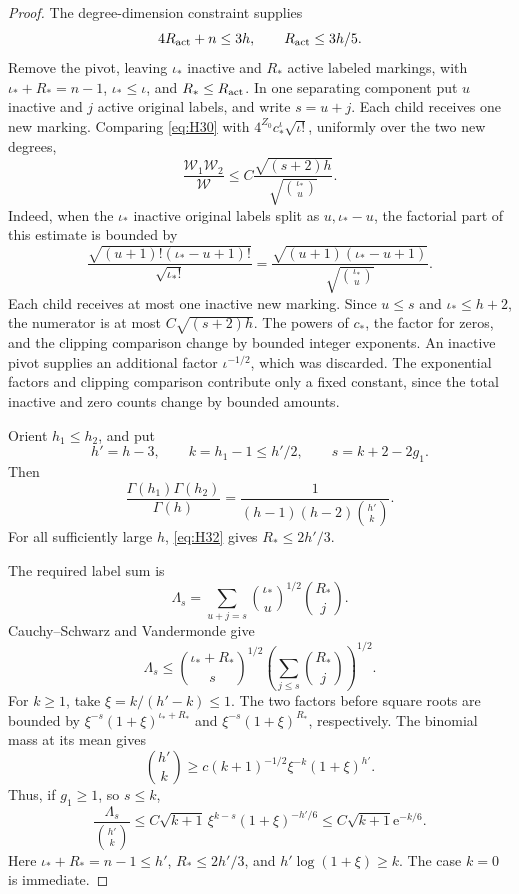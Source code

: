 \begin{proof}
The degree-dimension constraint supplies \begin{equation}
4R_{\rm act}+n\le3h,\qquad R_{\rm act}\le3h/5.
\label{eq:H32}
\end{equation} Remove the pivot, leaving \(\iota_*\) inactive and \(R_*\) active labeled
markings, with \(\iota_*+R_*=n-1\), \(\iota_*\le \iota\), and \(R_*\le R_{\rm act}\). In
one separating component put \(u\) inactive and \(j\) active original
labels, and write \(s=u+j\). Each child receives one new marking.
Comparing \eqref{eq:H30} with \(4^{Z_0}c_*^\iota\sqrt{\iota!}\), uniformly over the two
new degrees, \begin{equation}
\frac{\mathcal W_1\mathcal W_2}{\mathcal W}
\le C\frac{\sqrt{(s+2)h}}{\sqrt{\binom{\iota_*}u}}.
\label{eq:H33}
\end{equation} Indeed, when the \(\iota_*\) inactive original labels split as \(u,\iota_*-u\), the factorial part of this estimate is bounded by
\[
 \frac{\sqrt{(u+1)!(\iota_*-u+1)!}}{\sqrt{\iota_*!}}
 =\frac{\sqrt{(u+1)(\iota_*-u+1)}}{\sqrt{\binom{\iota_*}u}}.
\]
Each child receives at most one inactive new marking. Since \(u\le s\) and \(\iota_*\le h+2\), the numerator is at most \(C\sqrt{(s+2)h}\). The powers of \(c_*\), the factor for zeros, and the clipping comparison change by bounded integer exponents. An inactive pivot supplies an additional factor \(\iota^{-1/2}\), which
was discarded. The exponential factors and clipping comparison
contribute only a fixed constant, since the total inactive and zero
counts change by bounded amounts.

Orient \(h_1\le h_2\), and put \[
h'=h-3,\qquad k=h_1-1\le h'/2,\qquad s=k+2-2g_1.
\] Then \begin{equation}
\frac{\Gamma(h_1)\Gamma(h_2)}{\Gamma(h)}
=\frac1{(h-1)(h-2)\binom{h'}k}.
\label{eq:H34}
\end{equation} For all sufficiently large \(h\), \eqref{eq:H32} gives \(R_*\le2h'/3\).

The required label sum is \[
\Lambda_s=\sum_{u+j=s}\binom{\iota_*}u^{1/2}\binom{R_*}j.
\] Cauchy--Schwarz and Vandermonde give \begin{equation}
\Lambda_s\le
\binom{\iota_*+R_*}s^{1/2}
\left(\sum_{j\le s}\binom{R_*}j\right)^{1/2}.
\label{eq:H35}
\end{equation} For \(k\ge1\), take \(\xi =k/(h'-k)\le1\). The two factors before square
roots are bounded by \(\xi ^{-s}(1+\xi )^{\iota_*+R_*}\) and \(\xi ^{-s}(1+\xi )^{R_*}\),
respectively. The binomial mass at its mean gives \[
\binom{h'}k\ge c(k+1)^{-1/2}\xi ^{-k}(1+\xi )^{h'}.
\] Thus, if \(g_1\ge1\), so \(s\le k\), \begin{equation}
\frac{\Lambda_s}{\binom{h'}k}
\le C\sqrt{k+1}\,\xi ^{k-s}(1+\xi )^{-h'/6}
\le C\sqrt{k+1}\mathrm{e}^{-k/6}.
\label{eq:H36}
\end{equation} Here \(\iota_*+R_*=n-1\le h'\), \(R_*\le2h'/3\), and \(h'\log(1+\xi )\ge k\). The
case \(k=0\) is immediate.


\end{proof}
